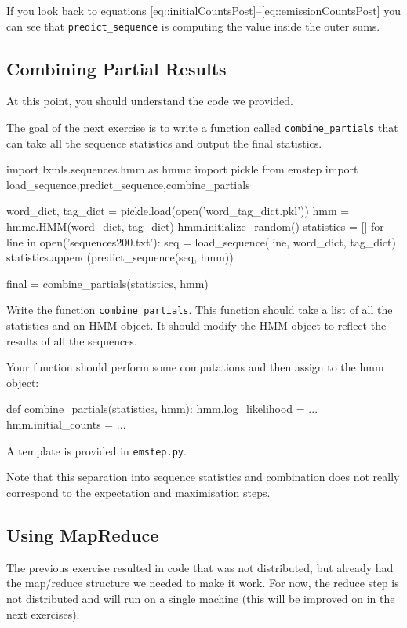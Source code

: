 If you look back to equations \eqref{eq::initialCountsPost}--\eqref{eq::emissionCountsPost} you can see that
\verb+predict_sequence+ is computing the value inside the outer sums.

\subsection{Combining Partial Results}
\label{beginMR}
At this point, you should understand the code we provided.

The goal of the next exercise is to write a function called \verb+combine_partials+
that can take all the sequence statistics and output the final statistics.

\begin{python}
import lxmls.sequences.hmm as hmmc
import pickle
from emstep import load_sequence,predict_sequence,combine_partials

word_dict, tag_dict = pickle.load(open('word_tag_dict.pkl'))
hmm = hmmc.HMM(word_dict, tag_dict)
hmm.initialize_random()
statistics = []
for line in open('sequences200.txt'):
    seq = load_sequence(line, word_dict, tag_dict)
    statistics.append(predict_sequence(seq, hmm))

final = combine_partials(statistics, hmm)
\end{python}

\begin{exercise}
Write the function \verb+combine_partials+. This function should take a list of all
the statistics and an HMM object. It should modify the HMM object to reflect
the results of all the sequences.

Your function should perform some computations and then assign to the hmm object:

\begin{python}
def combine_partials(statistics, hmm):
    hmm.log_likelihood = ...
    hmm.initial_counts = ...
\end{python}

A template is provided in \verb+emstep.py+.
\end{exercise}

Note that this separation into sequence statistics and combination does not
really correspond to the expectation and maximisation steps.

\subsection{Using MapReduce}
\label{sec:usingMR}
The previous exercise resulted in code that was not distributed, but already
had the map/reduce structure we needed to make it work. For now, the reduce step is not
distributed and will run on a single machine (this will be improved on in the
next exercises).

